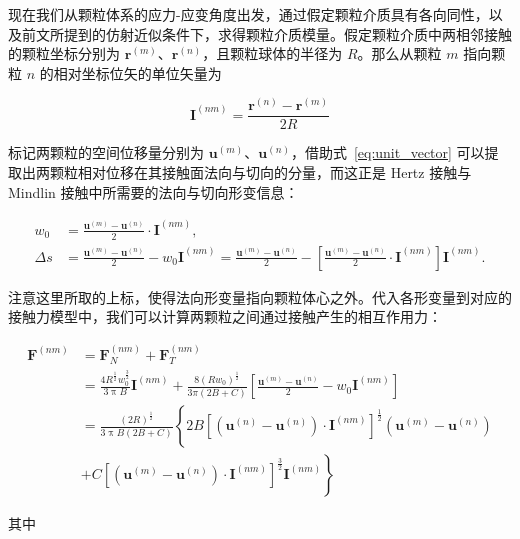现在我们从颗粒体系的应力-应变角度出发，通过假定颗粒介质具有各向同性，以及前文所提到的仿射近似条件下，求得颗粒介质模量\cite{WALTON1987213,zhouzhigang}。假定颗粒介质中两相邻接触的颗粒坐标分别为 $\mathbf{r}^{(m)}$、$\mathbf{r}^{(n)}$，且颗粒球体的半径为 $R$。那么从颗粒 $m$ 指向颗粒 $n$ 的相对坐标位矢的单位矢量为

\begin{equation}
  \mathbf{I}^{(nm)} = \frac{\mathbf{r}^{(n)} - \mathbf{r}^{(m)}}{2R}\label{eq:unit_vector}
\end{equation}

标记两颗粒的空间位移量分别为 $\mathbf{u}^{(m)}$、$\mathbf{u}^{(n)}$，借助式~\eqref{eq:unit_vector} 可以提取出两颗粒相对位移在其接触面法向与切向的分量，而这正是 Hertz 接触与 Mindlin 接触中所需要的法向与切向形变信息：

\begin{align}
  w_{0} &= \frac{\mathbf{u}^{(m)} - \mathbf{u}^{(n)}}{2}\cdot \mathbf{I}^{(nm)},\\
  \Delta s &= \frac{\mathbf{u}^{(m)} - \mathbf{u}^{(n)}}{2} - w_{0}\mathbf{I}^{(nm)} = \frac{\mathbf{u}^{(m)} - \mathbf{u}^{(n)}}{2} - \left[\frac{\mathbf{u}^{(m)} - \mathbf{u}^{(n)}}{2}\cdot \mathbf{I}^{(nm)}\right]\mathbf{I}^{(nm)}.
\end{align}

注意这里所取的上标，使得法向形变量指向颗粒体心之外。代入各形变量到对应的接触力模型中，我们可以计算两颗粒之间通过接触产生的相互作用力：

\begin{equation}
  \begin{aligned}
  \mathbf{F}^{(nm)} &= \mathbf{F}_{N}^{(nm)} + \mathbf{F}_{T}^{(nm)}\\
  &= \frac{4R^{\frac{1}{2}}w_{0}^{\frac{3}{2}}}{3\uppi B}\mathbf{I}^{(nm)} + \frac{8(Rw_{0})^{\frac{1}{2}}}{3\pi(2B+C)}\left[\frac{\mathbf{u}^{(m)} - \mathbf{u}^{(n)}}{2} - w_{0}\mathbf{I}^{(nm)}\right]\\
  &= \frac{(2R)^{\frac{1}{2}}}{3\uppi B(2B+C)}\left\{2B\left[\left(\mathbf{u}^{(n)} - \mathbf{u}^{(n)}\right)\cdot \mathbf{I}^{(nm)}\right]^{\frac{1}{2}}\left(\mathbf{u}^{(m)} - \mathbf{u}^{(n)}\right)\right.\\
   &+ \left.C\left[\left(\mathbf{u}^{(m)} - \mathbf{u}^{(n)}\right)\cdot \mathbf{I}^{(nm)}\right]^{\frac{3}{2}}\mathbf{I}^{(nm)}\right\}
  \end{aligned}\label{eq:contact_force}
\end{equation}

其中

